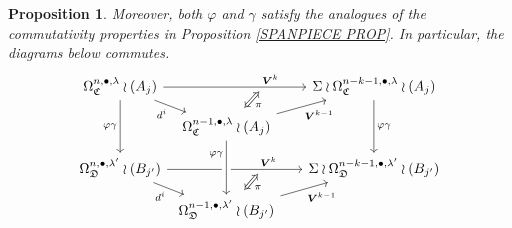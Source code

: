 \documentclass[a4paper,10pt
,draft
]{article}%
\numberwithin{equation}{section}
\numberwithin{figure}{section}
\newtheorem{proposition}[equation]{Proposition}%
\theoremstyle{definition} %
\newcommand{\1}{\ensuremath{\mathbbm 1}}%
\begin{document}
\begin{proposition}
Moreover, both $\varphi$ and $\gamma$ satisfy the analogues of the commutativity properties in Proposition \ref{SPANPIECE PROP}.
In particular, the diagrams below commutes.
\[
\begin{tikzcd}[column sep = 4pt, row sep = small]
	\Omega^{n,\bullet,\lambda}_{\mathfrak{C}} \wr (A_j)
	\ar{rrrrr}[name=toE2,near end]{\boldsymbol{V}^k} \ar{rd}[swap]{d^i} \ar{dd}[swap]{\varphi \gamma}
	&&&
	&&
	\Sigma \wr \Omega^{n-k-1,\bullet,\lambda}_{\mathfrak{C}} \wr (A_j) \ar{dd}{\varphi \gamma}
\\
	&
	|[alias=DBE2]|
	\Omega^{n-1,\bullet,\lambda}_{\mathfrak{C}} \wr (A_j) \ar{rrrru}[swap]{\boldsymbol{V}^{k-1}}
\\
	\Omega^{n,\bullet,\lambda'}_{\mathfrak{D}} \wr (B_{j'}) \ar{rrrrr}[name=toB2, near end]{\boldsymbol{V}^k} \ar{rd}[swap]{d^i}
	&&&
	&&
	\Sigma \wr \Omega^{n-k-1,\bullet,\lambda'}_{\mathfrak{D}} \wr (B_{j'})
\\
	&
	|[alias=D2]| \Omega^{n-1,\bullet,\lambda'}_{\mathfrak{D}} \wr (B_{j'}) \ar{rrrru}[swap]{\boldsymbol{V}^{k-1}}
\arrow[Leftrightarrow, from=DBE2, to=toE2, shorten <=0.15cm,shorten >=0.15cm
,swap,"\pi"
]
	\arrow[Leftrightarrow, from=D2, to=toB2, shorten <=0.15cm,shorten >=0.15cm,swap,"\pi"]
	\arrow[from=DBE2, to=D2, crossing over, near start, swap, "\varphi \gamma"]
\end{tikzcd}
\]

\end{proposition}
\end{document}
